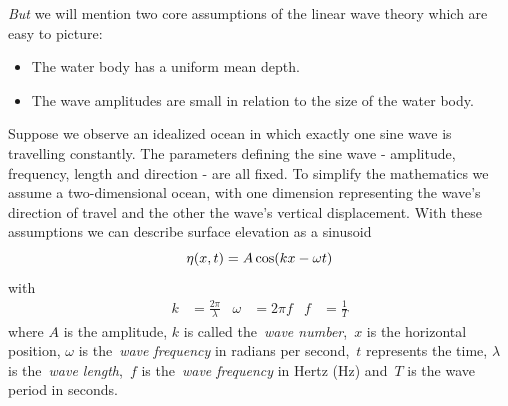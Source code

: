 \emph{But} we will mention two core assumptions of the linear wave theory which are easy to picture:
\begin{itemize}
 \item The water body has a uniform mean depth.
 \item The wave amplitudes are small in relation to the size of the water body.
\end{itemize}
Suppose we observe an idealized ocean in which exactly one sine wave is travelling constantly.
The parameters defining the sine wave - amplitude, frequency, length and direction - are all fixed.
To simplify the mathematics we assume a two-dimensional ocean, with one
dimension representing the wave's direction of travel and the  other the wave's
vertical displacement. With these assumptions we can describe surface elevation
as a sinusoid
%
\begin{equation}
\label{eq:sinusoid}
 \eta(x, t) = A\cos(kx - \omega t)\\
\end{equation}
with
\begin{align}
\label{eq:sinusoid_parameters}
 k &= \frac{2\pi}{\lambda} & \omega &= 2\pi f & f &= \frac{1}{T}
\end{align}
%
where $A$ is the amplitude, $k$ is called the~\emph{wave number},~$x$ is the horizontal position,
$\omega$ is the~\emph{wave frequency} in radians per second,~$t$ represents the time,
$\lambda$ is the~\emph{wave length},~$f$ is the~\emph{wave frequency} in Hertz (Hz) and~$T$
is the wave period in seconds.\\

